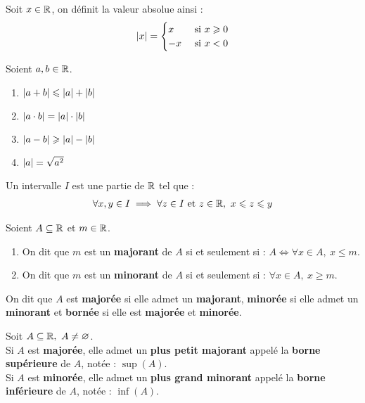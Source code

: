 \begin{definition}
    Soit $x \in \mathbb{R}$, on définit la valeur absolue ainsi :
    \begin{align*}
        \abs{x} =
        \begin{cases}
            x &\text{ si } x \geqslant 0 \\
            -x &\text{ si } x < 0
        \end{cases}
    \end{align*}
\end{definition}

\begin{proposition}
   	Soient $a, b \in \mathbb{R}$.
    \begin{enumerate}
            \item $\abs{a + b} \leqslant \abs{a} + \abs{b}$
            \item $\abs{a \cdot b} = \abs{a} \cdot \abs{b}$
            \item $\abs{a - b} \geqslant \abs{a} - \abs{b}$
            \item $\abs{a} = \sqrt{a^2}$
        \end{enumerate}
\end{proposition}

\begin{definition}[Intervalle]
    Un intervalle $I$ est une partie de $\mathbb{R}$ tel que :
    \begin{align*}
        \forall x, y \in I \implies \forall z \in I \text{ et } z \in \mathbb{R},\ x \leqslant z \leqslant y
    \end{align*}
\end{definition}

\begin{definition}
    Soient $A \subseteq \mathbb{R}$ et $m \in \mathbb{R}$.
    \begin{enumerate}
        \item On dit que $m$ est un \textbf{majorant} de $A$ si et seulement si : $A \iff \forall x \in A,\ x \leq m$.
        \item On dit que $m$ est un \textbf{minorant} de $A$ si et seulement si : $\forall x \in A,\ x \geq m$.
    \end{enumerate}
    On dit que $A$ est \textbf{majorée} si elle admet un \textbf{majorant}, \textbf{minorée} si elle admet un \textbf{minorant} et \textbf{bornée} si elle est \textbf{majorée} et \textbf{minorée}.
\end{definition}

\begin{theorem}
    Soit $A \subseteq \mathbb{R},\ A \neq \varnothing$. \\
    Si $A$ est \textbf{majorée}, elle admet un \textbf{plus petit majorant} appelé la \textbf{borne supérieure} de $A$, notée : $\sup(A)$.
    \\
    Si $A$ est \textbf{minorée}, elle admet un \textbf{plus grand minorant} appelé la \textbf{borne inférieure} de $A$, notée : $\inf(A)$.
\end{theorem}

